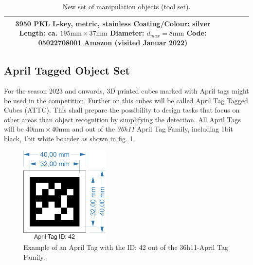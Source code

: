{\begin{table}[h!]
\begin{tabular}{|c|m{2cm}|c|c|m{8cm}|}
		3950 PKL L-key, metric, stainless\newline
		Coating/Colour: silver \newline
		Length: ca. $195\si{\milli\meter} \times 37\si{\milli\meter}$\newline
		Diameter: $d_{max}=8\si{\milli\meter}$\newline
		Code: 05022708001 \newline
		\href{https://www.amazon.co.uk/Wera-WER022708-Hexagon-Keys-Multi-Colour/dp/B00A8QXTNG}{Amazon} (visited Januar 2022)\\
		\hline
	
\end{tabular}
\caption{\RCAW New set of manipulation objects (tool set).}
\label{tab:new_objects2}
\end{table}

\clearpage
\subsection{April Tagged Object Set}
\label{ssec: April Tagged Object Set}

For the season 2023 and onwards, 3D printed cubes marked with April tags might be used in the competition. Further on this cubes will be called April Tag Tagged Cubes (ATTC).
This shall prepare the possibility to design tasks that focus on other areas than object recognition by simplifying the detection. 
All April Tags will be $40 \si{\milli\meter} \times 40 \si{\milli\meter}$ and out of the \textit{36h11} April Tag Family, including 1bit black, 1bit white boarder as shown in fig. \ref{fig:singleAprilTag}. 

\begin{figure}[h!]
	\centering
	\includegraphics[width= 0.4\textwidth ]{./images/singleAprilTAG42.png}
	\caption{Example of an April Tag with the ID: 42 out of the 36h11-April Tag Family.}
	\label{fig:singleAprilTag}
\end{figure}

}
